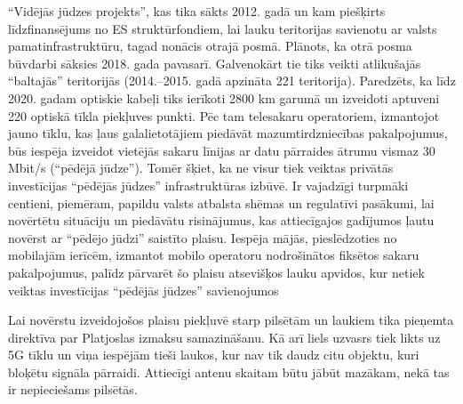\par
“Vidējās jūdzes projekts”, kas tika sākts 2012. gadā un kam piešķirts līdzfinansējums
no ES struktūrfondiem, lai lauku teritorijas savienotu ar valsts pamatinfrastruktūru,
tagad nonācis otrajā posmā. Plānots, ka otrā posma būvdarbi sāksies 2018. gada
pavasarī. Galvenokārt tie tiks veikti atlikušajās “baltajās” teritorijās (2014.–2015. gadā
apzināta 221 teritorija). Paredzēts, ka līdz 2020. gadam optiskie kabeļi tiks ierīkoti
2800 km garumā un izveidoti aptuveni 220 optiskā tīkla piekļuves punkti. Pēc tam
telesakaru operatoriem, izmantojot jauno tīklu, kas ļaus galalietotājiem piedāvāt
mazumtirdzniecības pakalpojumus, būs iespēja izveidot vietējās sakaru līnijas ar datu
pārraides ātrumu vismaz 30 Mbit/s (“pēdējā jūdze”). Tomēr šķiet, ka ne visur tiek
veiktas privātās investīcijas “pēdējās jūdzes” infrastruktūras izbūvē. Ir vajadzīgi
turpmāki centieni, piemēram, papildu valsts atbalsta shēmas un regulatīvi pasākumi,
lai novērtētu situāciju un piedāvātu risinājumus, kas attiecīgajos gadījumos ļautu
novērst ar “pēdējo jūdzi” saistīto plaisu. Iespēja mājās, pieslēdzoties no mobilajām
ierīcēm, izmantot mobilo operatoru nodrošinātos fiksētos sakaru pakalpojumus,
palīdz pārvarēt šo plaisu atsevišķos lauku apvidos, kur netiek veiktas investīcijas
“pēdējās jūdzes” savienojumos\cite{platjosla}
\par
Lai novērstu izveidojošos plaisu piekļuvē starp pilsētām un laukiem tika 
pieņemta direktīva par Platjoslas izmaksu samazināšanu. Kā arī liels uzvasrs tiek
likts uz 5G tīklu un viņa iespējām tieši laukos, kur nav tik daudz citu objektu, kuri 
bloķētu signāla pārraidi. Attiecīgi antenu skaitam būtu jābūt mazākam, nekā tas ir
nepieciešams pilsētās.

